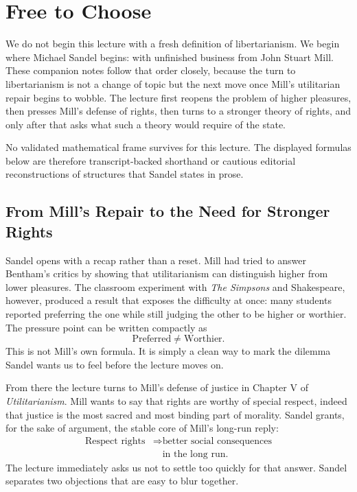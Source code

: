 \chapter{Free to Choose}

We do not begin this lecture with a fresh definition of libertarianism. We begin where Michael Sandel begins: with unfinished business from John Stuart Mill. These companion notes follow that order closely, because the turn to libertarianism is not a change of topic but the next move once Mill's utilitarian repair begins to wobble. The lecture first reopens the problem of higher pleasures, then presses Mill's defense of rights, then turns to a stronger theory of rights, and only after that asks what such a theory would require of the state.

\begin{remark}
No validated mathematical frame survives for this lecture. The displayed formulas below are therefore transcript-backed shorthand or cautious editorial reconstructions of structures that Sandel states in prose.
\end{remark}

\section{From Mill's Repair to the Need for Stronger Rights}

Sandel opens with a recap rather than a reset. Mill had tried to answer Bentham's critics by showing that utilitarianism can distinguish higher from lower pleasures. The classroom experiment with \emph{The Simpsons} and Shakespeare, however, produced a result that exposes the difficulty at once: many students reported preferring the one while still judging the other to be higher or worthier. The pressure point can be written compactly as
\begin{equation}
\text{Preferred} \neq \text{Worthier}.
\end{equation}
This is not Mill's own formula. It is simply a clean way to mark the dilemma Sandel wants us to feel before the lecture moves on.

From there the lecture turns to Mill's defense of justice in Chapter V of \emph{Utilitarianism}. Mill wants to say that rights are worthy of special respect, indeed that justice is the most sacred and most binding part of morality. Sandel grants, for the sake of argument, the stable core of Mill's long-run reply:
\begin{equation}
\begin{aligned}
\text{Respect rights}
&\Longrightarrow \text{better social consequences} \\
&\quad \text{in the long run}.
\end{aligned}
\end{equation}
The lecture immediately asks us not to settle too quickly for that answer. Sandel separates two objections that are easy to blur together.

